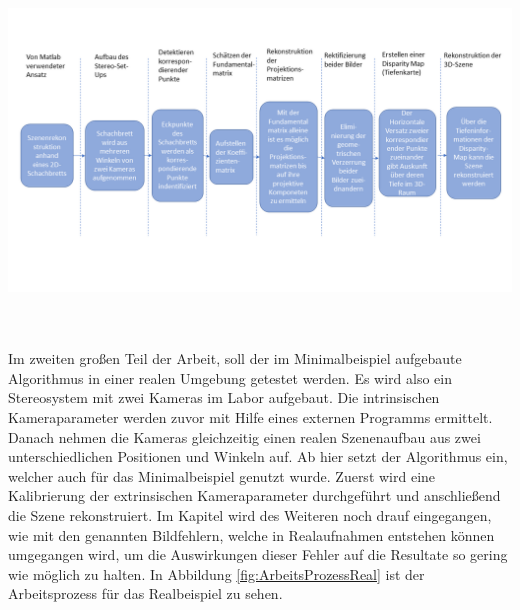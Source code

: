 \begin{minipage}{\linewidth}
	\centering
	\includegraphics[width=1.\linewidth]{images/ArbeitsProzessRealunkalibriert.png}
	\label{fig:ArbeitsProzessRealUnkalibriert}
\end{minipage}\\ \\

Im zweiten großen Teil der Arbeit, soll der im Minimalbeispiel aufgebaute Algorithmus in einer realen Umgebung getestet werden. Es wird also ein Stereosystem mit zwei Kameras im Labor aufgebaut. Die intrinsischen Kameraparameter werden zuvor mit Hilfe eines externen Programms ermittelt. Danach nehmen die Kameras gleichzeitig einen realen Szenenaufbau aus zwei unterschiedlichen Positionen und Winkeln auf. Ab hier setzt der Algorithmus ein, welcher auch für das Minimalbeispiel genutzt wurde. Zuerst wird eine Kalibrierung der extrinsischen Kameraparameter durchgeführt und anschließend die Szene rekonstruiert. Im Kapitel  wird des Weiteren noch drauf eingegangen, wie mit den genannten Bildfehlern, welche in Realaufnahmen entstehen können umgegangen wird, um die Auswirkungen dieser Fehler auf die Resultate so gering wie möglich zu halten. In Abbildung \ref{fig:ArbeitsProzessReal} ist der Arbeitsprozess für das Realbeispiel zu sehen. 

